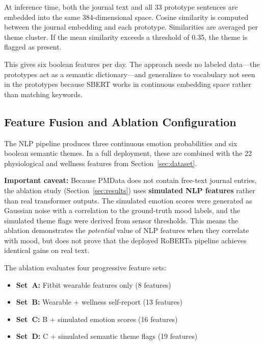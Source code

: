 \documentclass[conference]{IEEEtran}
\begin{document}
At inference time, both the journal text and all 33 prototype sentences are embedded into the same 384-dimensional space. Cosine similarity is computed between the journal embedding and each prototype. Similarities are averaged per theme cluster. If the mean similarity exceeds a threshold of 0.35, the theme is flagged as present.

This gives six boolean features per day. The approach needs no labeled data---the prototypes act as a semantic dictionary---and generalizes to vocabulary not seen in the prototypes because SBERT works in continuous embedding space rather than matching keywords.

\subsection{Feature Fusion and Ablation Configuration}

The NLP pipeline produces three continuous emotion probabilities and six boolean semantic themes. In a full deployment, these are combined with the 22 physiological and wellness features from Section~\ref{sec:dataset}.

\textbf{Important caveat:} Because PMData does not contain free-text journal entries, the ablation study (Section~\ref{sec:results}) uses \textbf{simulated NLP features} rather than real transformer outputs. The simulated emotion scores were generated as Gaussian noise with a correlation to the ground-truth mood labels, and the simulated theme flags were derived from sensor thresholds. This means the ablation demonstrates the \textit{potential} value of NLP features when they correlate with mood, but does not prove that the deployed RoBERTa pipeline achieves identical gains on real text.

The ablation evaluates four progressive feature sets:
\begin{itemize}
    \item \textbf{Set~A:} Fitbit wearable features only (8 features)
    \item \textbf{Set~B:} Wearable + wellness self-report (13 features)
    \item \textbf{Set~C:} B + simulated emotion scores (16 features)
    \item \textbf{Set~D:} C + simulated semantic theme flags (19 features)
\end{itemize}

\end{document}
